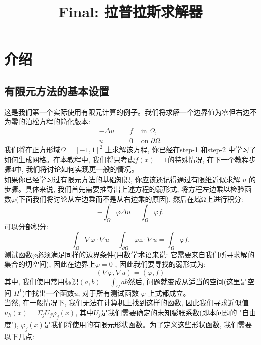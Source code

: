 \documentclass[12pt, a4paper, oneside]{ctexart}
\title{\textbf{Final: 拉普拉斯求解器}}
\begin{document}
\maketitle

\section{介绍}
\subsection{有限元方法的基本设置}
这是我们第一个实际使用有限元计算的例子。我们将求解一个边界值为零但右边不为零的泊松方程的简化版本: 
$$\begin{aligned}
    -\Delta u & =f & \text { in } \Omega, \\
    u & =0 & \text { on } \partial \Omega .
    \end{aligned}$$
我们将在正方形域$\Omega=[-1,1]^2$ 上求解该方程, 你已经在step-1 和step-2 中学习了如何生成网格。在本教程中, 我们将只考虑$f(x)=1$的特殊情况, 在下一个教程步骤4中, 我们将讨论如何实现更一般的情况。\\
如果你已经学习过有限元方法的基础知识, 你应该还记得通过有限维近似求解 $u$ 的步骤。具体来说, 我们首先需要推导出上述方程的弱形式, 将方程左边乘以检验函数$\varphi$(下面我们将讨论从左边乘而不是从右边乘的原因), 然后在域Ω上进行积分: 
$$-\int_{\Omega}\varphi \Delta u =\int_{\Omega}\varphi f . $$
可以分部积分: 
$$\int_{\Omega}\nabla \varphi\cdot \nabla u-\int_{\partial\Omega}\varphi \mathrm{n}\cdot\nabla u=\int_{\Omega}\varphi f . $$
测试函数$\varphi$必须满足同样的边界条件(用数学术语来说: 它需要来自我们所寻求解的集合的切空间), 因此在边界上$\varphi =0 $
, 因此我们要寻找的弱形式为: 
$$(\nabla \varphi ,\nabla u)=(\varphi ,f)$$
其中, 我们使用常用标识$(a,b)=\int_{\Omega}a b$然后, 问题就变成从适当的空间(这里是空间 $H^1$)中找出一个函数$u$, 对于所有测试函数 $\varphi$ 上式都成立。\\
当然, 在一般情况下, 我们无法在计算机上找到这样的函数, 因此我们寻求近似值$u_h(x)=\Sigma_j U_j\varphi_j(x)$, 其中$U_j$是我们需要确定的未知膨胀系数(即本问题的 "自由度"), $\varphi_j(x)$是我们将使用的有限元形状函数。为了定义这些形状函数, 我们需要以下几点: 
\end{document}
